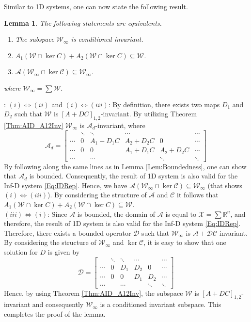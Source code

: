 \documentclass[journal,12pt,draftcls,onecolumn]{IEEEtran}
\newcommand{\bbm}{\begin{bmatrix}}
\newcommand{\ebm}{\end{bmatrix}}
\newcommand{\ssp}[1]{\mathscr{#1}}      \newcommand{\setssp}[1]{\mathfrak{#1}}   \newcommand{\fld}[1]{\mathbb{#1}}       \newcommand{\op}[1]{\mathcal{#1}}       \newcommand{\sumbanach}[1]{\sum{#1}}
\def\QEDclosed{\hfill\IEEEQEDclosed}
\renewcommand{\qed}{\QEDclosed}
\renewenvironment{proof}[1][\proofname]{\noindent\nobreakspace{\bfseries #1}:\;}{\qed\par}
\newtheorem{lemma}{Lemma}
\begin{document}
Similar to 1D systems, one can now state the following result.
\begin{lemma}\label{Lem:CA_Inv}
	The following statements are equivalents.
	\begin{enumerate}
		\renewcommand{\labelenumi}{(\roman{enumi})}
		\item The subspace $\ssp{W}_\infty$ is conditioned invariant.
		\item  $A_1(\ssp{W}\cap\ker C)+A_2(\ssp{W}\cap\ker C)\subseteq\ssp{W}$.
		\item $\op{A}(\ssp{W}_\infty\cap\ker\op{C})\subseteq\ssp{W}_\infty$.
	\end{enumerate}
	where $\ssp{W}_\infty = \sum \ssp{W}$.
\end{lemma}
\begin{proof}
	$(i)\Leftrightarrow(ii)$ and $(i)\Leftrightarrow(iii)$: By definition, there exists two maps $D_1$ and $D_2$ such that $\ssp{W}$ is $[A+DC]_{1,2}$-invariant. By utilizing Theorem \ref{Thm:AID_A12Inv} $\ssp{W}_\infty$ is $\op{A}_d$-invariant, where
	\begin{equation}
	\op{A}_d = \bbm \ &\ddots &\ddots &\cdots & &\cdots\\
	\cdots &0 &A_1+D_1C &A_2+D_2C &0 &\cdots\\
	\cdots &0 &0 &A_1+D_1C &A_2+D_2C &\cdots\\
	\cdots & &\cdots & &\ddots &\ddots \ebm
	\end{equation}
	By following along the same lines as in Lemma \ref{Lem:Boundedness}, one can show that $\op{A}_d$ is bounded. Consequently, the result of 1D system is also valid for the Inf-D system \eqref{Eq:IDRep}. Hence, we have $\op{A}(\ssp{W}_\infty\cap\ker\op{C})\subseteq\ssp{W}_\infty$ (that shows $(i)\Leftrightarrow(iii)$). By considering the structure of $\op{A}$ and $\op{C}$ it follows that $A_1(\ssp{W}\cap\ker C)+A_2(\ssp{W}\cap\ker C)\subseteq\ssp{W}$.\\
	$(iii)\Leftrightarrow(i)$: Since $\op{A}$ is bounded, the domain of $\op{A}$ is equal to $\op{X}=\sum \fld{R}^n$, and therefore, the result of 1D system is also valid for the Inf-D system \eqref{Eq:IDRep}. Therefore, there exists a bounded operator $\op{D}$ such that $\ssp{W}_\infty$ is $\op{A+DC}$-invariant. By considering the structure of $\ssp{W}_\infty$ and $\ker\op{C}$, it is easy to show that one solution for $D$ is given by
	\begin{equation}
	\op{D} = \bbm \ &\ddots &\ddots &\cdots & &\cdots\\
	\cdots &0 &D_1 &D_2 &0 &\cdots\\
	\cdots &0 &0 &D_1 &D_2 &\cdots\\
	\cdots & &\cdots & &\ddots &\ddots \ebm
	\end{equation}
	Hence, by using Theorem \ref{Thm:AID_A12Inv}, the subspace $\ssp{W}$ is $[A+DC]_{1,2}$-invariant and consequently $\ssp{W}_\infty$ is a conditioned invariant subspace. This completes the proof of the lemma.
\end{proof}
\end{document}
